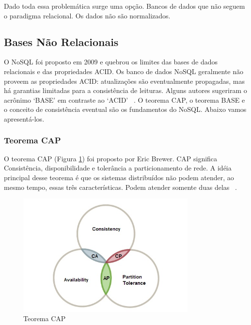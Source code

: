 Dado toda essa problemática surge uma opção. Bancos de dados que não seguem o paradigma relacional. Os dados não são normalizados.

\subsection{Bases Não Relacionais}

O NoSQL foi proposto em 2009 e quebrou os limites das bases de dados relacionais e das propriedades ACID. Os banco de dados NoSQL geralmente não proveem as propriedades ACID: atualizações são eventualmente propagadas, mas há garantias limitadas para a consistência de leituras. Alguns autores sugeriram  o acrônimo ‘BASE’ em contraste ao ‘ACID’ ~\cite{scalablesqlandnosql}. O teorema CAP, o teorema BASE e o conceito de consistência eventual são os fundamentos do NoSQL. Abaixo vamos apresentá-los.

\subsubsection{Teorema CAP}

O teorema CAP (Figura \ref{fig:captheorem}) foi proposto por Eric Brewer. CAP significa Consistência,  disponibilidade e tolerância a particionamento de rede.  A idéia principal desse teorema é que os sistemas distribuídos não podem atender, ao mesmo tempo, essas três características. Podem atender somente duas delas ~\cite{nosqlaplicassandra}.

	\begin{figure}[!htbp]
		\begin{center}
			\includegraphics[width=0.8\textwidth]{captheorem}
		\end{center}
		\caption{Teorema CAP ~\cite{capimage} }
		\label{fig:captheorem}
	\end{figure}

